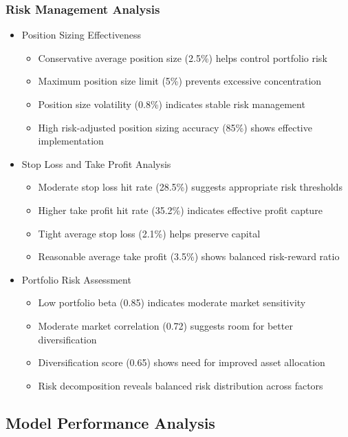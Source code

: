 \documentclass[conference]{IEEEtran}
\begin{document}
\subsubsection{Risk Management Analysis}
\begin{itemize}
    \item Position Sizing Effectiveness
    \begin{itemize}
        \item Conservative average position size (2.5\%) helps control portfolio risk
        \item Maximum position size limit (5\%) prevents excessive concentration
        \item Position size volatility (0.8\%) indicates stable risk management
        \item High risk-adjusted position sizing accuracy (85\%) shows effective implementation
    \end{itemize}
    
    \item Stop Loss and Take Profit Analysis
    \begin{itemize}
        \item Moderate stop loss hit rate (28.5\%) suggests appropriate risk thresholds
        \item Higher take profit hit rate (35.2\%) indicates effective profit capture
        \item Tight average stop loss (2.1\%) helps preserve capital
        \item Reasonable average take profit (3.5\%) shows balanced risk-reward ratio
    \end{itemize}
    
    \item Portfolio Risk Assessment
    \begin{itemize}
        \item Low portfolio beta (0.85) indicates moderate market sensitivity
        \item Moderate market correlation (0.72) suggests room for better diversification
        \item Diversification score (0.65) shows need for improved asset allocation
        \item Risk decomposition reveals balanced risk distribution across factors
    \end{itemize}
\end{itemize}

\subsection{Model Performance Analysis}
\end{document}

